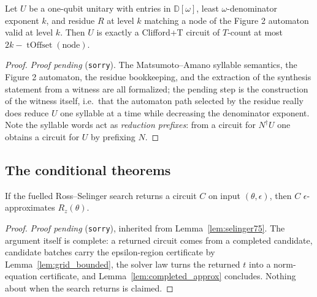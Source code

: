 \begin{lemma}
  \label{lem:ma_bound}
  \leanok
  Let $U$ be a one-qubit unitary with entries in $\mathbb{D}[\omega]$, least
  $\omega$-denominator exponent $k$, and residue $R$ at level $k$ matching a
  node of the Figure 2 automaton valid at level $k$.  Then $U$ is exactly a
  Clifford+T circuit of $T$-count at most $2k - \operatorname{tOffset}(\text{node})$.
\end{lemma}

\begin{proof}
  \emph{Proof pending} (\texttt{sorry}).  The Matsumoto--Amano syllable
  semantics, the Figure 2 automaton, the residue bookkeeping, and the extraction
  of the synthesis statement from a witness are all formalized; the pending step
  is the construction of the witness itself, i.e.\ that the automaton path
  selected by the residue really does reduce $U$ one syllable at a time while
  decreasing the denominator exponent.  Note the syllable words act as
  \emph{reduction prefixes}: from a circuit for $N^\dagger U$ one obtains a
  circuit for $U$ by prefixing $N$.
\end{proof}

\subsection{The conditional theorems}

\begin{theorem}
  \label{thm:rs_sound}
  \leanok
  If the fuelled Ross--Selinger search returns a circuit $C$ on input
  $(\theta,\epsilon)$, then $C$ $\epsilon$-approximates $R_z(\theta)$.
\end{theorem}

\begin{proof}
  \emph{Proof pending} (\texttt{sorry}), inherited from
  Lemma~\ref{lem:selinger75}.  The argument itself is complete: a returned
  circuit comes from a completed candidate, candidate batches carry the
  epsilon-region certificate by Lemma~\ref{lem:grid_bounded}, the solver law
  turns the returned $t$ into a norm-equation certificate, and
  Lemma~\ref{lem:completed_approx} concludes.  Nothing about when the search
  returns is claimed.
\end{proof}

